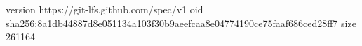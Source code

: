version https://git-lfs.github.com/spec/v1
oid sha256:8a1db44887d8e051134a103f30b9aeefcaa8e04774190ce75faaf686ced28ff7
size 261164
